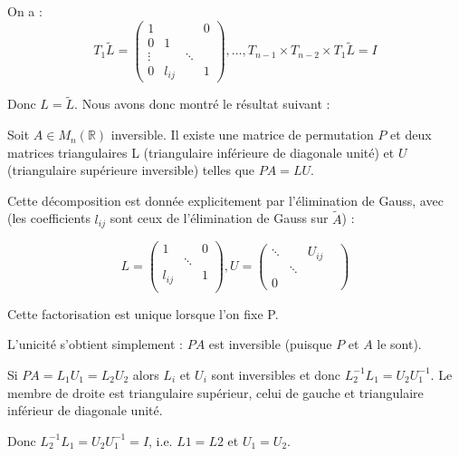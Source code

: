 \documentclass[a4paper,11pt]{article}
\newcommand{\R}{\mathbb{R}}
\theoremstyle{plain} %
\begin{document}
On a : 
\[
    T_1 \tilde{L} =
    \begin{pmatrix}
        1      &        &        & 0 \\
        0      & 1      &        &   \\
        \vdots &        & \ddots &   \\
        0      & l_{ij} &        & 1
    \end{pmatrix}
    , \dots , T_{n-1} \times T_{n-2} \times T_1 \tilde{L} = I
\]

Donc $L = \tilde{L}$. Nous avons donc montré le résultat suivant :

\begin{ftheo}
    Soit $A \in M_n(\R)$ inversible. Il existe une matrice de permutation $P$
et deux matrices triangulaires L (triangulaire inférieure de diagonale unité) et $U$ (triangulaire supérieure inversible) telles que $PA = LU$.

    Cette décomposition est donnée explicitement par l'élimination de Gauss, avec 
    (les coefficients $l_{ij}$ sont ceux de l'élimination de Gauss sur $\tilde{A}$) :

    \[
        L = \begin{pmatrix}
            1 & & 0 \\
            & \ddots & \\
            l_{ij} & & 1 \\
        \end{pmatrix}
        , U =
        \begin{pmatrix}
            \ddots & & U_{ij} \\
            & \ddots & & \\
            0 & &
        \end{pmatrix}
    \]

    Cette factorisation est unique lorsque l'on fixe P.
    \label{th:factoLU}
\end{ftheo}

\begin{remark}
    L'unicité s'obtient simplement :
    $PA$ est inversible (puisque $P$ et $A$ le sont).

    Si $PA = L_1 U_1 = L_2 U_2$ alors $L_i$ et $U_i$ sont inversibles et donc
    $L^{-1}_2 L_1 = U_2 U^{-1}_1$. Le membre de droite est triangulaire supérieur, celui de gauche et triangulaire inférieur de diagonale unité.

    Donc $L^{-1}_2 L_1 = U_2 U^{-1}_1 = I$, i.e. $L1 = L2$ et $U_1 = U_2$.
\end{remark}
\end{document}
